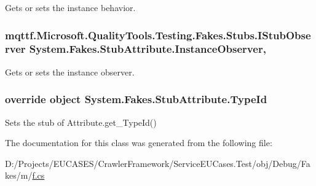 Gets or sets the instance behavior.

\hypertarget{class_system_1_1_fakes_1_1_stub_attribute_ad7b1b3bf7bc17f79fa63806d190e9450}{
\subsubsection[{Instance\-Observer}]{\setlength{\rightskip}{0pt plus 5cm}mqttf.\-Microsoft.\-Quality\-Tools.\-Testing.\-Fakes.\-Stubs.\-I\-Stub\-Observer System.\-Fakes.\-Stub\-Attribute.\-Instance\-Observer\hspace{0.3cm}{\ttfamily [get]}, {\ttfamily [set]}}}\label{class_system_1_1_fakes_1_1_stub_attribute_ad7b1b3bf7bc17f79fa63806d190e9450}


Gets or sets the instance observer.

\hypertarget{class_system_1_1_fakes_1_1_stub_attribute_aa7456d3ca7da1adb85f951ad0e945411}{
\subsubsection[{Type\-Id}]{\setlength{\rightskip}{0pt plus 5cm}override object System.\-Fakes.\-Stub\-Attribute.\-Type\-Id\hspace{0.3cm}{\ttfamily [get]}}}\label{class_system_1_1_fakes_1_1_stub_attribute_aa7456d3ca7da1adb85f951ad0e945411}


Sets the stub of Attribute.\-get\-\_\-\-Type\-Id()



The documentation for this class was generated from the following file\-:\begin{DoxyCompactItemize}
\item 
D\-:/\-Projects/\-E\-U\-C\-A\-S\-E\-S/\-Crawler\-Framework/\-Service\-E\-U\-Cases.\-Test/obj/\-Debug/\-Fakes/m/\hyperlink{m_2f_8cs}{f.\-cs}\end{DoxyCompactItemize}
